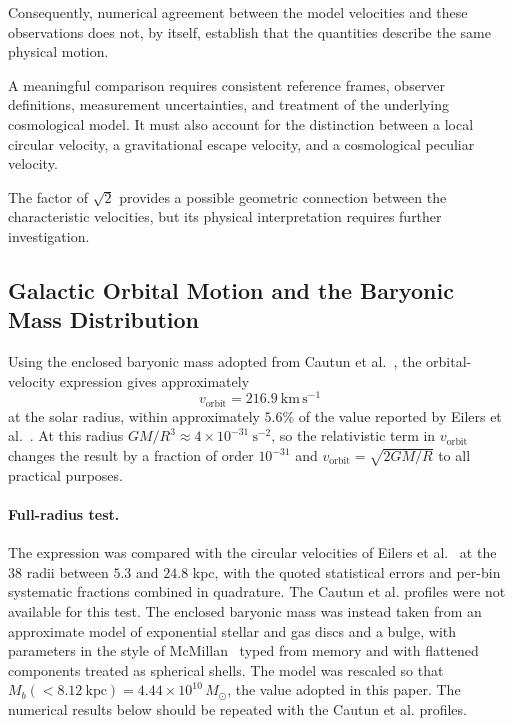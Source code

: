 \documentclass[pdflatex,sn-mathphys-num]{sn-jnl}%
\theoremstyle{thmstyleone}%
\theoremstyle{thmstyletwo}%
\theoremstyle{thmstylethree}%
\begin{document}
\begin{appendices}
Consequently, numerical agreement between the model velocities and these observations does not, by itself, establish that the quantities describe the same physical motion.

A meaningful comparison requires consistent reference frames, observer definitions, measurement uncertainties, and treatment of the underlying cosmological model. It must also account for the distinction between a local circular velocity, a gravitational escape velocity, and a cosmological peculiar velocity.

The factor of $\sqrt{2}$ provides a possible geometric connection between the characteristic velocities, but its physical interpretation requires further investigation.


\subsection{Galactic Orbital Motion and the Baryonic Mass Distribution}\label{sec_galactic_test}

Using the enclosed baryonic mass adopted from Cautun et al.~\cite{cautun2020milky}, the orbital-velocity expression gives approximately
\begin{equation}
    v_{\mathrm{orbit}}=216.9~\mathrm{km\,s^{-1}}
\end{equation}
at the solar radius, within approximately $5.6\%$ of the value reported by Eilers et al.~\cite{Eilers_2019}. At this radius $GM/R^3\approx4\times10^{-31}~\mathrm{s^{-2}}$, so the relativistic term in $v_{\mathrm{orbit}}$ changes the result by a fraction of order $10^{-31}$ and $v_{\mathrm{orbit}}=\sqrt{2GM/R}$ to all practical purposes. 

\paragraph{Full-radius test.} The expression was compared with the circular velocities of Eilers et al.~\cite{Eilers_2019} at the $38$ radii between $5.3$ and $24.8$ kpc, with the quoted statistical errors and per-bin systematic fractions combined in quadrature. The Cautun et al. profiles were not available for this test. The enclosed baryonic mass was instead taken from an approximate model of exponential stellar and gas discs and a bulge, with parameters in the style of McMillan~\cite{McMillan2017} typed from memory and with flattened components treated as spherical shells. The model was rescaled so that $M_b(<8.12~\mathrm{kpc})=4.44\times10^{10}\,M_\odot$, the value adopted in this paper. The numerical results below should be repeated with the Cautun et al. profiles.


\end{appendices}
\end{document}
